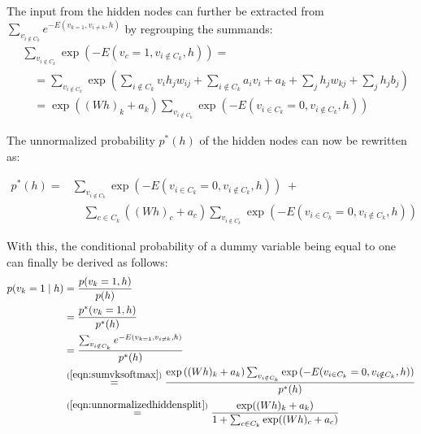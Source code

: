 \documentclass[12pt]{article}
\begin{document}
The input from the hidden nodes can further be extracted from $ \sum_{v_{i \notin C_k}} e^{-E(v_{k=1}, v_{i \neq k}, h)}$ by regrouping the summands:
\begin{align}
&\sum_{v_{i \notin C_k}} \exp ( - E(v_c = 1, v_{i \notin C_k},  h)) = \nonumber \\
&\quad = \sum_{v_{i \notin C_k}} \exp \left( \sum_{i \notin C_k} v_i h_j w_{ij} + \sum_{i \notin C_k} a_i v_i + a_k  + \sum_j h_j w_{kj} +\sum_j h_j b_j \right) \nonumber \\
&\quad = \exp \left( (Wh)_k + a_k \right) \sum_{v_{i \notin C_k}} \exp \left(-E(v_{i \in C_k} = 0, v_{i \notin C_k}, h) \right)
\label{eqn:sumvksoftmax}
\end{align}

The unnormalized probability $p^*(h)$ of the hidden nodes can now be rewritten as:

\begin{align}
p^*(h) =& \sum_{v_{i \notin C_k}} \exp (-E(v_{i \in C_k} = 0, v_{i \notin C_k}, h)) \; + \nonumber \\
&\quad  \sum_{c \in C_k} \left( (Wh)_c + a_c \right) \sum_{v_{i \notin C_k}} \exp \left(-E(v_{i \in C_k} = 0, v_{i \notin C_k}, h) \right)
\label{eqn:unnormalizedhiddensplit}
\end{align}

With this, the conditional probability of a dummy variable being equal to one can finally be derived as follows:
\begin{align*}
p(v_k = 1 \mid h) &= \frac{p(v_k = 1, h)}{p(h)} \\
  &= \frac{p^*(v_k = 1, h)}{p^*(h)}\\
  &= \frac{\sum_{v_{i \notin C_k}} e^{-E(v_{k=1}, v_{i \neq k}, h)}}{p^*(h)} \\
 &\stackrel{(\ref{eqn:sumvksoftmax})}{=} \frac{\exp \left( (Wh)_k + a_k \right) \sum_{v_{i \notin C_k}} \exp \left(-E(v_{i \in C_k} = 0, v_{i \notin C_k}, h) \right)}{p^*(h)}\\
&\stackrel{(\ref{eqn:unnormalizedhiddensplit})}{=} \frac{\exp((Wh)_k + a_k)}{1 + \sum_{c \in C_k} \exp ((Wh)_c + a_c)}
\end{align*}
\end{document}
